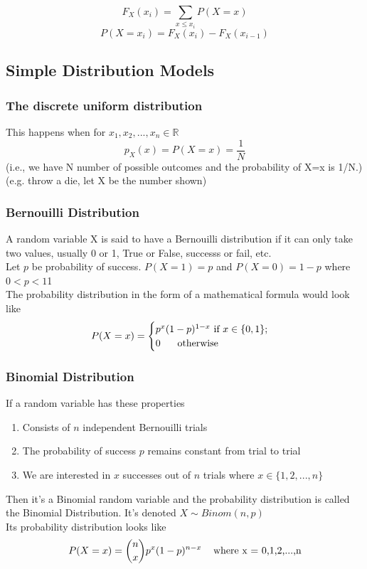 \documentclass{article}
\begin{document}
\[F_X(x_i) = \sum_{x\leq x_i}P(X=x)\]
\[P(X=x_i) = F_X(x_i)-F_X(x_{i-1})\]

\subsection{Simple Distribution Models}
\subsubsection{The discrete uniform distribution}
This happens when for $x_1,x_2,...,x_n\in \mathds{R}$
\[p_X(x)= P(X=x) = \frac{1}{N}\]
(i.e., we have N number of possible outcomes and the probability of X=x is 1/N.)\\
(e.g. throw a die, let X be the number shown)
\subsubsection{Bernouilli Distribution}
A random variable X is said to have a Bernouilli distribution if it can only take two values, usually 0 or 1, True or False, successs or fail, etc.\\
Let $p$ be probability of success. $P(X=1)=p$ and $P(X=0) = 1-p$ where $0<p<1$1\\
The probability distribution in the form of a mathematical formula would look like 
\[
P(X=x) = \begin{cases}
    p^x(1-p)^{1-x}\text{ if } x \in \{0,1\};\\
    0 \hspace{6mm}\text{otherwise}
\end{cases}
\]
\subsubsection{Binomial Distribution}
If a random variable has these properties
\begin{enumerate}
    \item Consists of $n$ independent Bernouilli trials
    \item The probability of success $p$ remains constant from trial to trial
    \item We are interested in $x$ successes out of $n$ trials where $x\in\{1,2,...,n\}$
\end{enumerate}
Then it's a Binomial random variable and the probability distribution is called the Binomial Distribution. It's denoted $X\sim Binom(n,p)$\\
Its probability distribution looks like 
\[P(X=x)=\binom{n}{x}p^x(1-p)^{n-x} \hspace{3mm}\text{ where x = 0,1,2,...,n}\]
\end{document}
